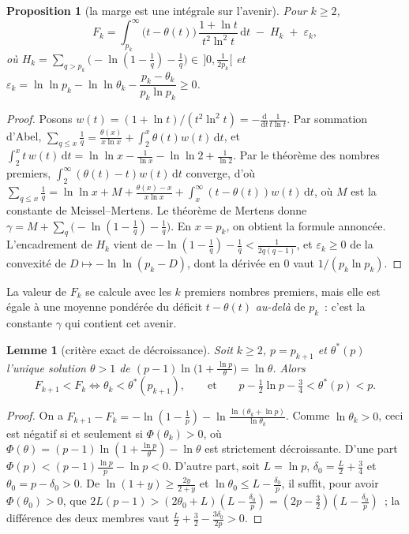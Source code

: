 \documentclass[11pt,a4paper]{article}
\newtheorem{proposition}[theoreme]{Proposition}
\newtheorem{lemme}[theoreme]{Lemme}
\theoremstyle{definition}
\theoremstyle{remark}
\newcommand{\dd}{\mathrm{d}}
\begin{document}
\begin{proposition}[la marge est une intégrale sur l'avenir]\label{prop:avenir}
Pour $k\ge2$,
\[
F_k=\int_{p_k}^\infty\bigl(t-\theta(t)\bigr)\,\frac{1+\ln t}{t^2\ln^2t}\,\dd t\;-\;H_k\;+\;\varepsilon_k,
\]
où $H_k=\sum_{q>p_k}\bigl(-\ln(1-\tfrac1q)-\tfrac1q\bigr)\in\,]0,\tfrac1{2p_k}[$ et
$\varepsilon_k=\ln\ln p_k-\ln\ln\theta_k-\dfrac{p_k-\theta_k}{p_k\ln p_k}\ge0$.
\end{proposition}
\begin{proof}
Posons $w(t)=(1+\ln t)/(t^2\ln^2t)=-\frac{\dd}{\dd t}\frac1{t\ln t}$. Par sommation d'Abel,
$\sum_{q\le x}\frac1q=\frac{\theta(x)}{x\ln x}+\int_2^x\theta(t)w(t)\,\dd t$, et $\int_2^xt\,w(t)\,\dd t=\ln\ln x-\frac1{\ln x}-\ln\ln2+\frac1{\ln2}$.
Par le théorème des nombres premiers, $\int_2^\infty(\theta(t)-t)w(t)\,\dd t$ converge, d'où
$\sum_{q\le x}\frac1q=\ln\ln x+M+\frac{\theta(x)-x}{x\ln x}+\int_x^\infty(t-\theta(t))w(t)\,\dd t$, où $M$ est la constante de
Meissel--Mertens. Le théorème de Mertens donne $\gamma=M+\sum_q\bigl(-\ln(1-\frac1q)-\frac1q\bigr)$. En $x=p_k$, on obtient la
formule annoncée. L'encadrement de $H_k$ vient de $-\ln(1-\frac1q)-\frac1q<\frac1{2q(q-1)}$, et $\varepsilon_k\ge0$ de la convexité de
$D\mapsto-\ln\ln(p_k-D)$, dont la dérivée en $0$ vaut $1/(p_k\ln p_k)$.
\end{proof}

La valeur de $F_k$ se calcule avec les $k$ premiers nombres premiers, mais elle est égale à une moyenne pondérée du déficit
$t-\theta(t)$ \emph{au-delà} de $p_k$~: c'est la constante $\gamma$ qui contient cet avenir.

\begin{lemme}[critère exact de décroissance]\label{lem:critere}
Soit $k\ge2$, $p=p_{k+1}$ et $\theta^*(p)$ l'unique solution $\theta>1$ de $(p-1)\ln\bigl(1+\frac{\ln p}{\theta}\bigr)=\ln\theta$. Alors
\[
F_{k+1}<F_k\iff\theta_k<\theta^*(p_{k+1}),\qquad\text{et}\qquad p-\tfrac12\ln p-\tfrac34<\theta^*(p)<p .
\]
\end{lemme}
\begin{proof}
On a $F_{k+1}-F_k=-\ln(1-\frac1p)-\ln\frac{\ln(\theta_k+\ln p)}{\ln\theta_k}$. Comme $\ln\theta_k>0$, ceci est négatif si et seulement si
$\Phi(\theta_k)>0$, où $\Phi(\theta)=(p-1)\ln(1+\frac{\ln p}\theta)-\ln\theta$ est strictement décroissante. D'une part
$\Phi(p)<(p-1)\frac{\ln p}p-\ln p<0$. D'autre part, soit $L=\ln p$, $\delta_0=\frac L2+\frac34$ et $\theta_0=p-\delta_0>0$. De
$\ln(1+y)\ge\frac{2y}{2+y}$ et $\ln\theta_0\le L-\frac{\delta_0}p$, il suffit, pour avoir $\Phi(\theta_0)>0$, que
$2L(p-1)>(2\theta_0+L)(L-\frac{\delta_0}p)=(2p-\frac32)(L-\frac{\delta_0}p)$~; la différence des deux membres vaut
$\frac L2+\frac32-\frac{3\delta_0}{2p}>0$.
\end{proof}
\end{document}
